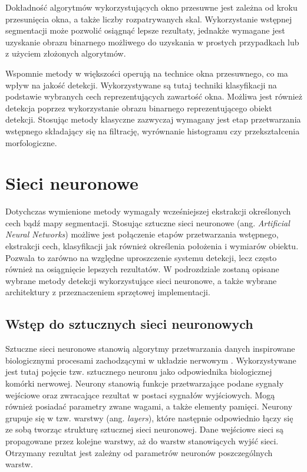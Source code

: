 Dokładność algorytmów wykorzystujących okno przesuwne jest zależna od kroku przesunięcia okna, a także liczby rozpatrywanych skal. 
Wykorzystanie wstępnej segmentacji może pozwolić osiągnąć  lepsze rezultaty, jednakże wymagane jest uzyskanie obrazu binarnego możliwego do uzyskania w prostych przypadkach lub z użyciem złożonych algorytmów. 

Wspomnie metody w większości operują na technice okna przesuwnego, co ma wpływ na jakość detekcji.
Wykorzystywane są tutaj techniki klasyfikacji na podstawie wybranych cech reprezentujących zawartość okna.
Możliwa jest również detekcja poprzez wykorzystanie obrazu binarnego reprezentującego obiekt detekcji.
Stosując metody klasyczne zazwyczaj wymagany jest etap przetwarzania wstępnego składający się na filtrację, wyrównanie histogramu czy przekształcenia morfologiczne.


\section{Sieci neuronowe}

Dotychczas wymienione metody wymagały wcześniejszej ekstrakcji określonych cech bądź mapy segmentacji.
Stosując sztuczne sieci neuronowe (ang. \emph{Artificial Neural Networks}) możliwe jest połączenie etapów przetwarzania wstępnego, ekstrakcji cech, klasyfikacji jak również określenia położenia i wymiarów obiektu. 
Pozwala to zarówno na względne uproszczenie systemu detekcji, lecz często również na osiągnięcie lepszych rezultatów. 
W podrozdziale zostaną opisane wybrane metody detekcji wykorzystujące sieci neuronowe, a także wybrane architektury z przeznaczeniem sprzętowej implementacji.

\subsection{Wstęp do sztucznych sieci neuronowych}
Sztuczne sieci neuronowe stanowią algorytmy przetwarzania danych inspirowane biologicznymi procesami zachodzącymi w układzie nerwowym \cite{SN_tadeusiewicz}. 
Wykorzystywane jest tutaj pojęcie tzw. sztucznego neuronu jako odpowiednika biologicznej komórki nerwowej. 
Neurony stanowią funkcje przetwarzające podane sygnały wejściowe oraz zwracające rezultat w postaci sygnałów wyjściowych. 
Mogą również posiadać parametry zwane wagami, a także elementy pamięci.
Neurony grupuje się w tzw. warstwy (ang. \emph{layers}), które następnie odpowiednio łączy się ze sobą tworząc strukturę sztucznej sieci neuronowej.
Dane wejściowe sieci są propagowane przez kolejne warstwy, aż do warstw stanowiących wyjść sieci.
Otrzymany rezultat jest zależny od parametrów neuronów poszczególnych warstw.

